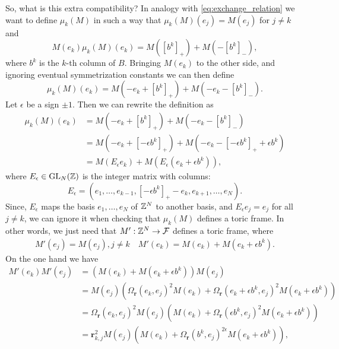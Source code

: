 \documentclass{article}
\begin{document}
So, what is this extra compatibility?
In analogy with \cref{eq:exchange_relation} we want to define $\mu_k(M)$ in such
a way that $\mu_k(M)(e_j) = M(e_j)$ for $j \neq k$ and
\begin{equation*}
    M(e_k)\mu_k(M)(e_k) = M([b^k]_+) + M(-[b^k]_-),
\end{equation*}
where $b^k$ is the $k$-th column of $B$.
Bringing $M(e_k)$ to the other side,
and ignoring eventual symmetrization constants we can then define
\begin{equation*}
    \mu_k(M)(e_k) = M(-e_k + [b^k]_+) + M(-e_k - [b^k]_-).
\end{equation*}
Let $\epsilon$ be a sign $\pm 1$. Then we can rewrite the definition as
\begin{align*}
    \mu_k(M)(e_k)
     & = M(-e_k + [b^k]_+) + M(-e_k - [b^k]_-)                                    \\
     & = M(-e_k + [-\epsilon b^k]_+) + M(-e_k - [-\epsilon b^k]_+ + \epsilon b^k) \\
     & = M(E_\epsilon e_k) + M(E_\epsilon(e_k + \epsilon b^k)),
\end{align*}
where $E_\epsilon \in \operatorname{GL}_N(\mathbb{Z})$ is the integer matrix with columns:
\begin{equation*}
    E_\epsilon = (e_1, \dots ,e_{k-1}, [-\epsilon b^k]_+ -e_k, e_{k+1}, \dots, e_N).
\end{equation*}
Since, $E_\epsilon$ maps the basis $e_1, \dots, e_N$ of $\mathbb{Z}^N$ to another basis,
and $E_\epsilon e_j = e_j$ for all $j \neq k$,
we can ignore it when checking that $\mu_k(M)$ defines a toric frame.
In other words,
we just need that $M' : \mathbb{Z}^N \to \mathcal{F}$ defines a toric frame, where
\begin{align*}
    M'(e_j) = M(e_j), j\neq k \quad M'(e_k) = M(e_k) + M(e_k + \epsilon b^k).
\end{align*}
On the one hand we have
\begin{align*}
    M'(e_k)M'(e_j)
     & = (M(e_k) + M(e_k + \epsilon b^k))M(e_j)                                                                                \\
     & = M(e_j)(\Omega_{\mathbf{r}}(e_k, e_j)^2 M(e_k) + \Omega_{\mathbf{r}}(e_k + \epsilon b^k, e_j)^2 M(e_k + \epsilon b^k)) \\
     & =\Omega_{\mathbf{r}}(e_k, e_j)^2  M(e_j)(M(e_k) + \Omega_{\mathbf{r}}(\epsilon b^k, e_j)^2 M(e_k + \epsilon b^k))       \\
     & =\mathbf{r}_{k,j}^2  M(e_j)(M(e_k) + \Omega_{\mathbf{r}}(b^k, e_j)^{2 \epsilon} M(e_k + \epsilon b^k)),
\end{align*}
\end{document}
